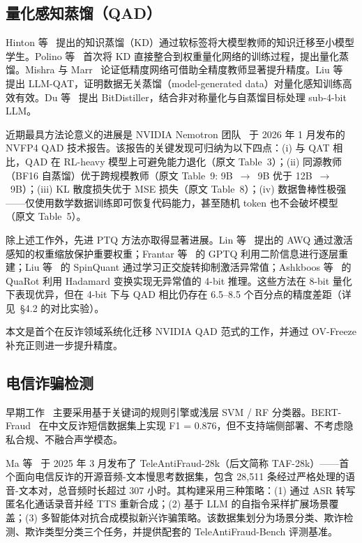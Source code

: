 \documentclass[UTF8,a4paper,10pt,twocolumn]{ctexart}
\theoremstyle{plain}
\begin{document}
\subsection{量化感知蒸馏（QAD）}

Hinton 等~\cite{hinton2015distilling} 提出的知识蒸馏（KD）通过软标签将大模型教师的知识迁移至小模型学生。Polino 等~\cite{polino2018model} 首次将 KD 直接整合到权重量化网络的训练过程，提出量化蒸馏。Mishra 与 Marr~\cite{mishra2018apprentice} 论证低精度网络可借助全精度教师显著提升精度。Liu 等~\cite{liu2024llm} 提出 LLM-QAT，证明数据无关蒸馏（model-generated data）对量化感知训练高效有效。Du 等~\cite{du2024bitdistiller} 提出 BitDistiller，结合非对称量化与自蒸馏目标处理 sub-4-bit LLM。

近期最具方法论意义的进展是 NVIDIA Nemotron 团队~\cite{xin2026qad} 于 2026 年 1 月发布的 NVFP4 QAD 技术报告。该报告的关键发现可归纳为以下四点：(i) 与 QAT 相比，QAD 在 RL-heavy 模型上可避免能力退化（原文 Table~3）；(ii) 同源教师（BF16 自蒸馏）优于跨规模教师（原文 Table~9: 9B~$\to$~9B 优于 12B~$\to$~9B）；(iii) KL 散度损失优于 MSE 损失（原文 Table~8）；(iv) 数据鲁棒性极强——仅使用数学数据训练即可恢复代码能力，甚至随机 token 也不会破坏模型（原文 Table~5）。

除上述工作外，先进 PTQ 方法亦取得显著进展。Lin 等~\cite{lin2024awq} 提出的 AWQ 通过激活感知的权重缩放保护重要权重；Frantar 等~\cite{frantar2023gptq} 的 GPTQ 利用二阶信息进行逐层重建；Liu 等~\cite{liu2025spinquant} 的 SpinQuant 通过学习正交旋转抑制激活异常值；Ashkboos 等~\cite{ashkboos2024quarot} 的 QuaRot 利用 Hadamard 变换实现无异常值的 4-bit 推理。这些方法在 8-bit 量化下表现优异，但在 4-bit 下与 QAD 相比仍存在 6.5--8.5 个百分点的精度差距（详见~\S4.2 的对比实验）。

本文是首个在反诈领域系统化迁移 NVIDIA QAD 范式的工作，并通过 OV-Freeze 补充正则进一步提升精度。

\subsection{电信诈骗检测}

早期工作~\cite{tariq2020comprehensive,yusof2018sms} 主要采用基于关键词的规则引擎或浅层 SVM / RF 分类器。BERT-Fraud~\cite{chen2024bert} 在中文反诈短信数据集上实现 F1 = 0.876，但不支持端侧部署、不考虑隐私合规、不融合声学模态。

Ma 等~\cite{ma2025teleantifraud} 于 2025 年 3 月发布了 TeleAntiFraud-28k（后文简称 TAF-28k）——首个面向电信反诈的开源音频-文本慢思考数据集，包含 28,511 条经过严格处理的语音-文本对，总音频时长超过 307 小时。其构建采用三种策略：(1) 通过 ASR 转写匿名化通话录音并经 TTS 重新合成；(2) 基于 LLM 的自指令采样扩展场景覆盖；(3) 多智能体对抗合成模拟新兴诈骗策略。该数据集划分为场景分类、欺诈检测、欺诈类型分类三个任务，并提供配套的 TeleAntiFraud-Bench 评测基准。
\end{document}
